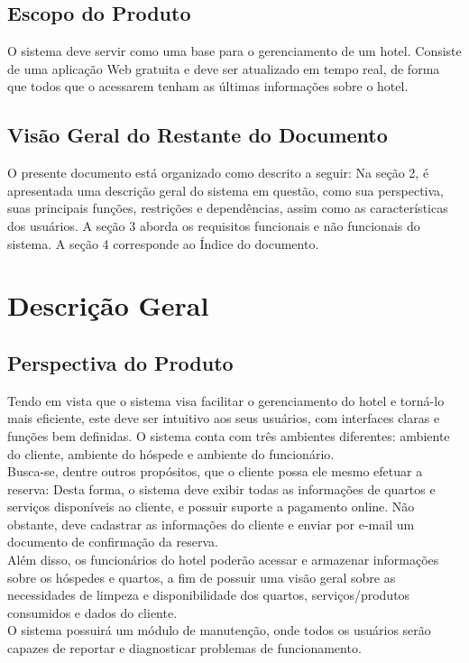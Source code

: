 \documentclass[notitlepage]{article}
\begin{document}
\subsection{Escopo do Produto}
O sistema deve servir como uma base para o gerenciamento de um hotel. Consiste de uma aplicação Web gratuita e deve ser atualizado em tempo real, de forma que todos que o acessarem tenham as últimas informações sobre o hotel.
\subsection{Visão Geral do Restante do Documento}
O presente documento está organizado como descrito a seguir: Na seção 2, é apresentada uma descrição geral do sistema em questão, como sua perspectiva, suas principais funções, restrições e dependências, assim como as características dos usuários. A seção 3 aborda os requisitos funcionais e não funcionais do sistema. A seção 4 corresponde ao Índice do documento. 
\section{Descrição Geral}
\subsection{Perspectiva do Produto}
Tendo em vista que o sistema visa facilitar o gerenciamento do hotel e torná-lo mais eficiente, este deve ser intuitivo aos seus usuários, com interfaces claras e funções bem definidas. O sistema conta com três ambientes diferentes: ambiente do cliente, ambiente do hóspede e ambiente do funcionário.\\
\indent Busca-se, dentre outros propósitos, que o cliente possa ele mesmo efetuar a reserva: Desta forma, o sistema deve exibir todas as informações de quartos e serviços disponíveis ao cliente, e possuir suporte a pagamento online. Não obstante, deve cadastrar as informações do cliente e enviar por e-mail um documento de confirmação da reserva. \\
\indent Além disso, os funcionários do hotel poderão acessar e armazenar informações sobre os hóspedes e quartos, a fim de possuir uma visão geral sobre as necessidades de limpeza e disponibilidade dos quartos, serviços/produtos consumidos e dados do cliente.\\
\indent O sistema possuirá um módulo de manutenção, onde todos os usuários serão capazes de reportar e diagnosticar problemas de funcionamento. 
\end{document}
